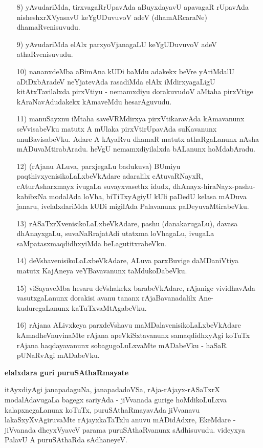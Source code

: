 \begin{itemize}
\item [8)] yAvudariMda, tirxvagaRrUpavAda aBuyxdayavU apavagaR rUpavAda nisheshxrXVyasavU keYgUDuvuvoV adeV (dhamARcaraNe) dhamaRvenisuvudu.
\item [9)] yAvudariMda elAlx parxyoVjanagaLU keYgUDuvuvoV adeV athaRvenisuvudu.
\item [10)] nananxdeMba aBimAna kUDi baMdu adakekx beVre yAriMdalU aDiDxbAradeV neYjatevAda rasadiMda elAlx iMdirxyagaLigU kitAtxTavilalxda pirxVtiyu - nemamxdiyu dorakuvudoV aMtaha pirxVtige kAraNavAdudakekx kAmaveMdu hesarAguvudu. 
\item [11)] manuSayxnu iMtaha saveVRMdirxya pirxVtikaravAda kAmavanunx seVvisabeVku matutx A mUlaka pirxVtirUpavAda suKavanunx anuBavisabeVku. Adare A kAyaRvu dhamaR matutx athaRgaLanunx nAsha mADuvaMtirabAradu. heVgU nemamxdiyilalxda bALanunx hoMdabAradu.
\item [12)] (rAjanu ALuva, parxjegaLu badukuva) BUmiyu paqthivxyenisikoLaLxbeVkAdare adaralilx cAtuvaRNayxR, cAturAsharxmayx ivugaLa suvayxvasethx idudx, dhAnayx-hiraNayx-pashu-kabibxNa modalAda loVha, biTiTxyAgiyU kUli paDedU kelasa mADuva janaru, ivelalxdariMda kUDi migilAda Palavanunx paDeyuvaMtirabeVku.
\item [13)] rASaTxrXvenisikoLaLxbeVkAdare, pashu (danakarugaLu), davasa dhAnayxgaLu, suvaNaRrajatAdi utatxma loVhagaLu, ivugaLa saMpatasxmaqdidhxyiMda beLagutitxrabeVku.
\item [14)] deVshavenisikoLaLxbeVkAdare, ALuva parxBuvige daMDaniVtiya matutx KajAneya veYBavavanunx taMdukoDabeVku.
\item [15)] viSayaveMba hesaru deVshakekx barabeVkAdare, rAjanige vividhavAda vasutxgaLanunx dorakisi avanu tananx rAjaBavanadalilx Ane-kuduregaLanunx kaTuTxvaMtAgabeVku.
\item [16)] rAjana ALivxkeya parxdeVshavu maMDalavenisikoLaLxbeVkAdare kAmadheVnuvinaMte rAjana apeVkiSxtavanunx samaqdidhxyAgi koTuTx rAjana haqdayavanunx sobagugoLuLxvaMte mADabeVku - haSaR pUNaRvAgi mADabeVku.
\end{itemize}

{\bigskip
\noindent
{\large\bf elalxdara guri puruSAthaRmayate}}\label{page96}
\medskip

\noindent
itAyxdiyAgi janapadaguNa, janapadadoVSa, rAja-rAjayx-rASaTxrX modalAdavugaLa bagegx sariyAda - jiVvanada gurige hoMdikoLuLxva kalapxnegaLanunx koTuTx, puruSAthaRmayavAda jiVvanavu lakaSxyXvAgiruvaMte rAjayxkaTaTxlu anuvu mADidAdxre, EkeMdare - jiVvanada dheyxVyaveV parama puruSAthaRvanunx sAdhisuvudu. videyxya PalavU A puruSAthaRda sAdhaneyeV.

